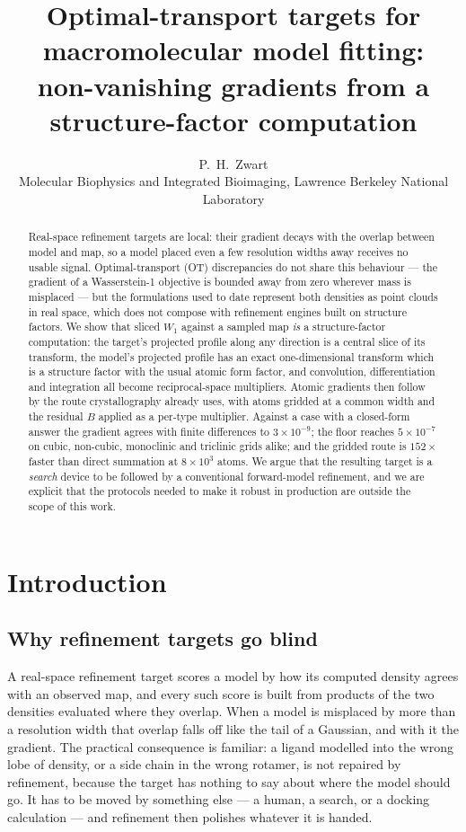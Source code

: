 \documentclass[11pt,a4paper]{article}
\title{\bf Optimal-transport targets for macromolecular model fitting:\\
non-vanishing gradients from a structure-factor computation}
\author{P.\ H.\ Zwart\\
\small Molecular Biophysics and Integrated Bioimaging, Lawrence Berkeley National Laboratory}
\date{}
\begin{document}
\maketitle

\begin{abstract}\noindent
Real-space refinement targets are local: their gradient decays with the overlap between
model and map, so a model placed even a few resolution widths away receives no usable
signal. Optimal-transport (OT) discrepancies do not share this behaviour --- the gradient
of a Wasserstein-1 objective is bounded away from zero wherever mass is misplaced --- but
the formulations used to date represent both densities as point clouds in real space, which
does not compose with refinement engines built on structure factors. We show that sliced
$W_1$ against a sampled map \emph{is} a structure-factor computation: the target's
projected profile along any direction is a central slice of its transform, the model's
projected profile has an exact one-dimensional transform which is a structure factor with
the usual atomic form factor, and convolution, differentiation and integration all become
reciprocal-space multipliers. Atomic gradients then follow by the route crystallography
already uses, with atoms gridded at a common width and the residual $B$ applied as a
per-type multiplier. Against a case with a closed-form answer the gradient agrees with
finite differences to $3\times10^{-9}$; the floor reaches $5\times10^{-7}$ on cubic,
non-cubic, monoclinic and triclinic grids alike; and the gridded route is $152\times$
faster than direct summation at $8\times10^{3}$ atoms. We argue that the resulting target
is a \emph{search} device to be followed by a conventional forward-model refinement, and
we are explicit that the protocols needed to make it robust in production are outside the
scope of this work.
\end{abstract}

\section{Introduction}

\subsection{Why refinement targets go blind}

A real-space refinement target scores a model by how its computed density agrees with an
observed map, and every such score is built from products of the two densities evaluated
where they overlap. When a model is misplaced by more than a resolution width that overlap
falls off like the tail of a Gaussian, and with it the gradient. The practical consequence
is familiar: a ligand modelled into the wrong lobe of density, or a side chain in the wrong
rotamer, is not repaired by refinement, because the target has nothing to say about where
the model should go. It has to be moved by something else --- a human, a search, or a
docking calculation --- and refinement then polishes whatever it is handed.
\end{document}
